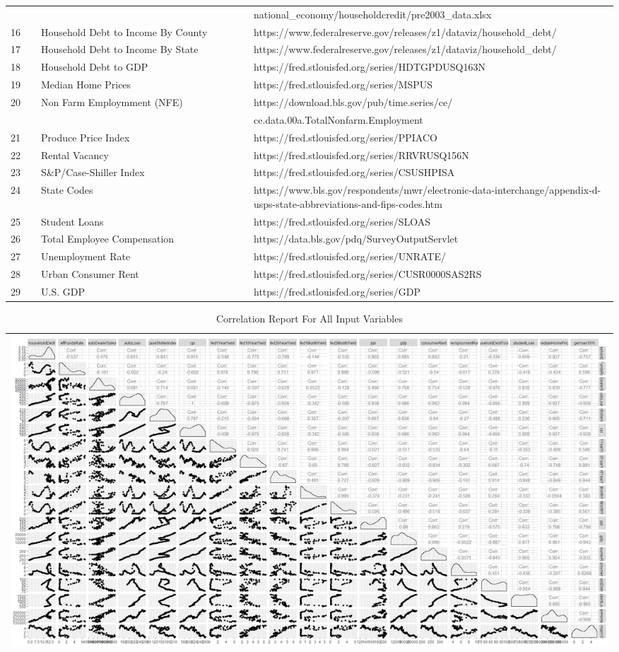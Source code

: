 \documentclass[sigconf,nonacm,11pt]{acmart}
\begin{document}
\begin{appendix}
\begin{table}[ht]
\begin{tabular}{p{0.05\linewidth}p{0.35\linewidth}p{0.6\linewidth}}
 & & national\_economy/householdcredit/pre2003\_data.xlsx\\
16 & Household Debt to Income By County & https://www.federalreserve.gov/releases/z1/dataviz/household\_debt/\\
17 & Household Debt to Income By State  & https://www.federalreserve.gov/releases/z1/dataviz/household\_debt/\\
18 & Household Debt to GDP & https://fred.stlouisfed.org/series/HDTGPDUSQ163N\\
19 & Median Home Prices & https://fred.stlouisfed.org/series/MSPUS\\
20 & Non Farm Employmment (NFE) & https://download.bls.gov/pub/time.series/ce/\\
 & & ce.data.00a.TotalNonfarm.Employment\\
21 & Produce Price Index  & https://fred.stlouisfed.org/series/PPIACO\\
22 & Rental Vacancy & https://fred.stlouisfed.org/series/RRVRUSQ156N\\
23 & S\&P/Case-Shiller Index & https://fred.stlouisfed.org/series/CSUSHPISA\\
24 & State Codes & https://www.bls.gov/respondents/mwr/electronic-data-interchange/appendix-d-usps-state-abbreviations-and-fips-codes.htm\\
25 & Student Loans & https://fred.stlouisfed.org/series/SLOAS\\
26 & Total Employee Compensation & https://data.bls.gov/pdq/SurveyOutputServlet\\
27 & Unemployment Rate & https://fred.stlouisfed.org/series/UNRATE/\\
28 & Urban Consumer Rent & https://fred.stlouisfed.org/series/CUSR0000SAS2RS\\
29 & U.S. GDP  & https://fred.stlouisfed.org/series/GDP\\
\hline
\end{tabular}
\end{table}




\begin{table}[ht]
\caption{Correlation Report For All Input Variables}
\centering
\begin{tabular}{p{1.0\linewidth}}
\hline
\includegraphics[scale = 0.27]{Correlation_Plot_All.png}\\
\hline
\end{tabular}
\end{table}


\end{appendix}
\end{document}
